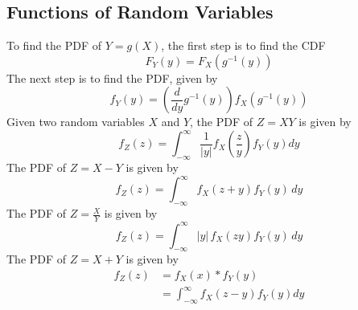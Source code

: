 \documentclass[nobib]{tufte-handout}
\begin{document}
\subsection{Functions of Random Variables}
To find the PDF of $Y = g(X)$, the first
step is to find the CDF
\begin{equation}
    F_Y(y) = F_X(g^{-1}(y))
\end{equation}
The next step is to find the PDF, given by
\begin{equation}
    f_Y(y) = \left(\frac{d}{dy}g^{-1}(y)\right)f_X(g^{-1}(y))
\end{equation}
Given two random variables $X$ and $Y$, the
PDF of $Z = XY$ is given by
\begin{equation}
    f_Z(z) = \int_{-\infty}^{\infty} \frac{1}{|y|} f_X(\frac{z}{y}) f_Y(y) dy
\end{equation}
The PDF of $Z = X - Y$ is given by
\begin{equation}
    f_Z(z) = \int_{-\infty}^{\infty} f_X(z + y) f_Y(y) \, dy
\end{equation}
The PDF of $Z = \frac{X}{Y}$ is given by
\begin{equation}
    f_Z(z) = \int_{-\infty}^{\infty} |y| \, f_X(z y) f_Y(y) \, dy
\end{equation}
The PDF of $Z = X + Y$ is given by
\begin{align}
    f_Z(z) & = f_X(x) * f_Y(y)                          \\
           & = \int_{-\infty}^{\infty} f_X(z-y)f_Y(y)dy
\end{align}
\end{document}
